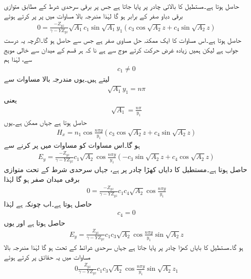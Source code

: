 حاصل ہوتا ہے۔مستطیل کا بالائی چادر  پر پایا جاتا ہے جس پر برقی سرحدی شرط کے مطابق متوازی برقی دباو صفر کے برابر ہو گا لہٰذا مندرجہ بالا مساوات میں  پر  پر کرتے ہوئے
\begin{align*}
0=\frac{-Z_{yz}}{\gamma-Y Z_{yz}} \sqrt{A_1}c_1 \sin \sqrt{A_1} y_1 \left(c_3 \cos \sqrt{A_2} z + c_4 \sin \sqrt{A_2} z\right)
\end{align*}
حاصل ہوتا ہے۔اس مساوات کا ایک ممکنہ حل  مساوی صفر ہے جس سے  حاصل ہو گا۔اگرچہ یہ درست جواب ہے لیکن ہمیں زیادہ غرض حرکت کرتے موج سے ہے نا کہ ہر قسم کے میدان سے خالی مویج سے، لہٰذا ہم 
\begin{align}
c_1 \ne 0
\end{align}
لیتے ہیں۔یوں مندرجہ بالا مساوات سے
\begin{align*}
\sqrt{A_1} y_1 = n \pi
\end{align*}
یعنی
\begin{align}\label{مساوات_مویج_عمومی_حل_پہلا_مستقل}
\sqrt{A_1}=\frac{n \pi}{y_1}
\end{align}
حاصل ہوتا ہے جہاں  ممکن ہے۔یوں
\begin{align}\label{مساوات_مویج_موج_حل_ٹ}
H_x=n_1 \cos \frac{n \pi y}{y_1} \left(c_3 \cos \sqrt{A_2} z + c_4 \sin \sqrt{A_2} z\right)
\end{align}
ہو گا۔اس مساوات کو مساوات  میں پر کرنے سے
\begin{align*}
E_y=\frac{-Z_{yz}}{\gamma-Y Z_{yz}}c_1 \sqrt{A_2}\cos \frac{n \pi y}{y_1} \left(-c_3 \sin \sqrt{A_2} z + c_4 \cos \sqrt{A_2} z\right)
\end{align*}
حاصل ہوتا ہے۔مستطیل کا دایاں کھڑا چادر  پر ہے، جہاں سرحدی شرط کے تحت متوازی برقی میدان صفر ہو گا لہٰذا
\begin{align*}
0=\frac{-Z_{yz}}{\gamma-Y Z_{yz}}c_1 c_4 \sqrt{A_2}\cos \frac{n \pi y}{y_1}  
\end{align*}
حاصل ہوتا ہے۔اب چونکہ  ہے لہٰذا
\begin{align}
c_4=0
\end{align}
حاصل ہوتا ہے اور یوں
\begin{align*}
E_y=\frac{Z_{yz}}{\gamma-Y Z_{yz}}c_1 c_3 \sqrt{A_2}\cos \frac{n \pi y}{y_1} \sin \sqrt{A_2} z
\end{align*}
ہو گا۔مستطیل کا بایاں کھڑا چادر  پر پایا جاتا ہے جہاں سرحدی شرائط کے تحت  ہو گا لہٰذا مندرجہ بالا مساوات میں یہ حقائق پر کرتے ہوئے
\begin{align*}
0\frac{Z_{yz}}{\gamma-Y Z_{yz}}c_1 c_3 \sqrt{A_2}\cos \frac{n \pi y}{y_1} \sin \sqrt{A_2} z_1
\end{align*}
